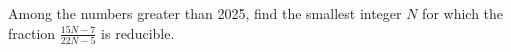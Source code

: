 Among the numbers greater than 2025, find the smallest integer $N$ for which the fraction ${\frac{15N-7}{22N-5}}$ is reducible. 


